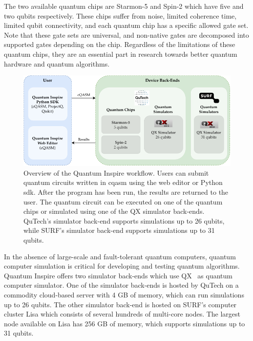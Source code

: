 The two available quantum chips are Starmon-5 and Spin-2 which have five and two qubits respectively.
These chips suffer from noise, limited coherence time, limited qubit connectivity, and each quantum chip has a specific allowed gate set.
Note that these gate sets are universal, and non-native gates are decomposed into supported gates depending on the chip.
Regardless of the limitations of these quantum chips, they are an essential part in research towards better quantum hardware and quantum algorithms.
\begin{figure}[ht]
    \centering
    \includegraphics[width=1\linewidth]{figures/qi-workflow.pdf}
    \caption[Overview of the Quantum Inspire workflow.]{
        Overview of the Quantum Inspire workflow.
        Users can submit quantum circuits written in \gls{cqasm} using the web editor or Python \gls{sdk}.
        After the program has been run, the results are returned to the user.
        The quantum circuit can be executed on one of the quantum chips or simulated using one of the QX simulator back-ends.
        QuTech's simulator back-end supports simulations up to 26 qubits, while SURF's simulator back-end supports simulations up to 31 qubits.
    }
    \label{fig:qi-workflow}
\end{figure}

In the absence of large-scale and fault-tolerant quantum computers, quantum computer simulation is critical for developing and testing quantum algorithms.
Quantum Inspire offers two simulator back-ends which use QX~\cite{khammassi2017qx} as quantum computer simulator.
One of the simulator back-ends is hosted by QuTech on a commodity cloud-based server with 4 GB of memory, which can run simulations up to 26 qubits.
The other simulator back-end is hosted on SURF's computer cluster Lisa which consists of several hundreds of multi-core nodes.
The largest node available on Lisa has 256 GB of memory, which supports simulations up to 31 qubits.

